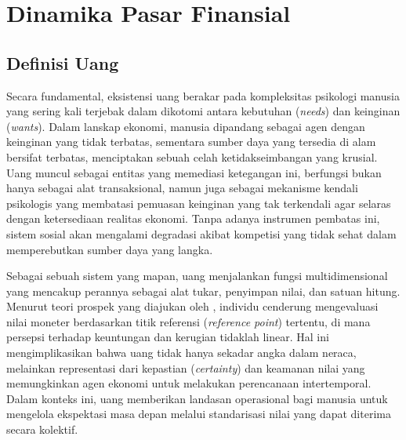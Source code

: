 \section{Dinamika Pasar Finansial}

\subsection{Definisi Uang}

Secara fundamental, eksistensi uang berakar pada kompleksitas psikologi manusia yang sering kali terjebak dalam dikotomi antara kebutuhan (\textit{needs}) dan keinginan (\textit{wants}). Dalam lanskap ekonomi, manusia dipandang sebagai agen dengan keinginan yang tidak terbatas, sementara sumber daya yang tersedia di alam bersifat terbatas, menciptakan sebuah celah ketidakseimbangan yang krusial. Uang muncul sebagai entitas yang memediasi ketegangan ini, berfungsi bukan hanya sebagai alat transaksional, namun juga sebagai mekanisme kendali psikologis yang membatasi pemuasan keinginan yang tak terkendali agar selaras dengan ketersediaan realitas ekonomi. Tanpa adanya instrumen pembatas ini, sistem sosial akan mengalami degradasi akibat kompetisi yang tidak sehat dalam memperebutkan sumber daya yang langka.

Sebagai sebuah sistem yang mapan, uang menjalankan fungsi multidimensional yang mencakup perannya sebagai alat tukar, penyimpan nilai, dan satuan hitung. Menurut teori prospek yang diajukan oleh \cite{kahneman_prospect_1979}, individu cenderung mengevaluasi nilai moneter berdasarkan titik referensi (\textit{reference point}) tertentu, di mana persepsi terhadap keuntungan dan kerugian tidaklah linear. Hal ini mengimplikasikan bahwa uang tidak hanya sekadar angka dalam neraca, melainkan representasi dari kepastian (\textit{certainty}) dan keamanan nilai yang memungkinkan agen ekonomi untuk melakukan perencanaan intertemporal. Dalam konteks ini, uang memberikan landasan operasional bagi manusia untuk mengelola ekspektasi masa depan melalui standarisasi nilai yang dapat diterima secara kolektif.

